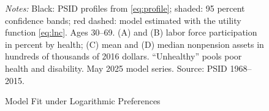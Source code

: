 \begin{figure}[!htbp]
\centering
\caption{Model Fit under Logarithmic Preferences}
\label{fig:fitlnc}
\vspace{6pt}
\setlength{\tabcolsep}{0pt}%
\begin{minipage}{0.95\textwidth}\footnotesize{}
\textit{Notes:} Black: PSID profiles from \eqref{eq:profile}; shaded: 95 percent confidence bands; red dashed: model estimated with the utility function \eqref{eq:lnc}. Ages 30--69. (A) and (B) labor force participation in percent by health; (C) mean and (D) median nonpension assets in hundreds of thousands of 2016 dollars. ``Unhealthy'' pools poor health and disability. May 2025 model series. Source: PSID 1968--2015.
\end{minipage}
\end{figure}
\FloatBarrier
